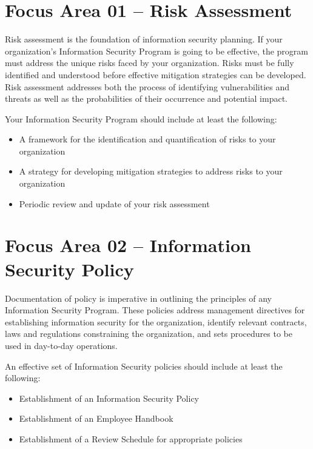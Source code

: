 \documentclass{needs}
\begin{document}
	\section{Focus Area 01 -- Risk Assessment}
	
		Risk assessment is the foundation of information security planning.  If your organization’s Information Security Program is going to be effective, the program must address the unique risks faced by your organization.  Risks must be fully identified and understood before effective mitigation strategies can be developed.  Risk assessment addresses both the process of identifying vulnerabilities and threats as well as the probabilities of their occurrence and potential impact.
		
		Your Information Security Program should include at least the following: 
		\begin{itemize}
			\item A framework for the identification and quantification of risks to your organization
			\item A strategy for developing mitigation strategies to address risks to your organization
			\item Periodic review and update of your risk assessment
		\end{itemize}	
		
		
		\fOneTable
		
	\section{Focus Area 02 -- Information Security Policy}
	
		Documentation of policy is imperative in outlining the principles of any Information Security Program.  These policies address management directives for establishing information security for the organization, identify relevant contracts, laws and regulations constraining the organization, and sets procedures to be used in day-to-day operations.
		
		An effective set of Information Security policies should include at least the following: 
		\begin{itemize}
			\item Establishment of an Information Security Policy
			\item Establishment of an Employee Handbook
			\item Establishment of a Review Schedule for appropriate policies
		\end{itemize}
		
\end{document}
